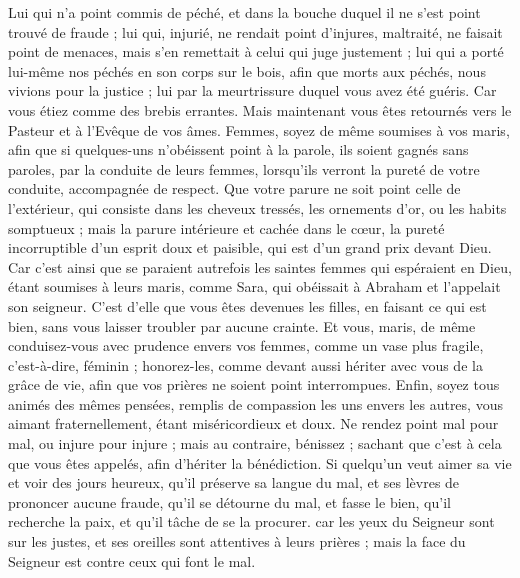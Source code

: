 \begin{multicols}{2}
Lui qui n'a point commis de péché, et dans la bouche duquel il ne s'est point trouvé de fraude ;
lui qui, injurié, ne rendait point d'injures, maltraité, ne faisait point de menaces, mais s'en remettait à celui qui juge justement ;
lui qui a porté lui-même nos péchés en son corps sur le bois, afin que morts aux péchés, nous vivions pour la justice ; lui par la meurtrissure duquel vous avez été guéris.
Car vous étiez comme des brebis errantes. Mais maintenant vous êtes retournés vers le Pasteur et à l'Evêque de vos âmes.
\VerseOne{}Femmes, soyez de même soumises à vos maris, afin que si quelques-uns n'obéissent point à la parole, ils soient gagnés sans paroles, par la conduite de leurs femmes,
lorsqu'ils verront la pureté de votre conduite, accompagnée de respect.
Que votre parure ne soit point celle de l'extérieur, qui consiste dans les cheveux tressés, les ornements d'or, ou les habits somptueux ;
mais la parure intérieure et cachée dans le cœur, la pureté incorruptible d'un esprit doux et paisible, qui est d'un grand prix devant Dieu.
Car c'est ainsi que se paraient autrefois les saintes femmes qui espéraient en Dieu, étant soumises à leurs maris,
comme Sara, qui obéissait à Abraham et l'appelait son seigneur. C'est d'elle que vous êtes devenues les filles, en faisant ce qui est bien, sans vous laisser troubler par aucune crainte.
Et vous, maris, de même conduisez-vous avec prudence envers vos femmes, comme un vase plus fragile, c'est-à-dire, féminin ; honorez-les, comme devant aussi hériter avec vous de la grâce de vie, afin que vos prières ne soient point interrompues.
Enfin, soyez tous animés des mêmes pensées, remplis de compassion les uns envers les autres, vous aimant fraternellement, étant miséricordieux et doux.
Ne rendez point mal pour mal, ou injure pour injure ; mais au contraire, bénissez ; sachant que c'est à cela que vous êtes appelés, afin d'hériter la bénédiction.
Si quelqu'un veut aimer sa vie et voir des jours heureux, qu'il préserve sa langue du mal, et ses lèvres de prononcer aucune fraude,
qu'il se détourne du mal, et fasse le bien, qu'il recherche la paix, et qu'il tâche de se la procurer.
car les yeux du Seigneur sont sur les justes, et ses oreilles sont attentives à leurs prières ; mais la face du Seigneur est contre ceux qui font le mal.

\end{multicols}
